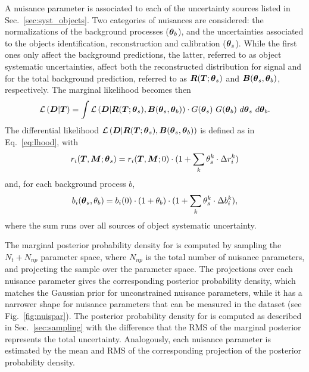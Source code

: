 A nuisance parameter is associated to each of the uncertainty sources
listed in Sec.~\ref{sec:syst_objects}. Two categories of nuisances
are considered: the normalizations of the background processes
($\boldsymbol{\theta}{}_b$), and the uncertainties associated to the objects
identification, reconstruction and calibration ($\boldsymbol{\theta}{}_s$).
While the first ones only affect the background predictions, the
latter, referred to as object systematic uncertainties, affect both the
reconstructed distribution for \ttbar{} signal and for
the total background prediction, referred to as
$\boldsymbol{R}{}(\boldsymbol{T}{};\boldsymbol{\theta}{}_s)$ and
$\boldsymbol{B}{}(\boldsymbol{\theta}{}_s,\boldsymbol{\theta}{}_b)$, respectively.
The marginal likelihood becomes then
\begin{equation}
\label{eq:marginalLhood}
  \mathcal{L}\left(\boldsymbol{D}{}|\boldsymbol{T}{}\right)=
  \int
  \mathcal{L}\left(\boldsymbol{D}{}|\boldsymbol{R}{}(\boldsymbol{T}{};\boldsymbol{\theta}{}_s),\boldsymbol{B}{}(\boldsymbol{\theta}{}_s,\boldsymbol{\theta}{}_b)\right) 
  \cdot{} G(\boldsymbol{\theta}{}_s) ~G(\boldsymbol{\theta}{}_b)
  ~d\boldsymbol{\theta}{}_s ~d\boldsymbol{\theta}{}_b.
\end{equation}
The differential likelihood
$\mathcal{L}\left(\boldsymbol{D}{}|\boldsymbol{R}{}(\boldsymbol{T}{};\boldsymbol{\theta}{}_s),\boldsymbol{B}{}(\boldsymbol{\theta}{}_s,\boldsymbol{\theta}{}_b)\right)$
is defined as in Eq.~\ref{eq:lhood}, with 
\begin{equation}
r_i(\boldsymbol{T}{},\boldsymbol{M}{};\boldsymbol{\theta}{}_s) =
r_i(\boldsymbol{T}{},\boldsymbol{M}{};0) \cdot ( 1 + \sum_k
\theta_s^k\cdot\Delta r_i^k )
\end{equation}
and, for each background process $b$,
\begin{equation}
b_i(\boldsymbol{\theta}{}_s,\theta_b) =
b_i(0) \cdot ( 1 + \theta_b) \cdot
(1 + \sum_k \theta_s^k\cdot\Delta b_i^k ),
\end{equation}
where the sum runs over all sources of object systematic uncertainty.

The marginal posterior probability density for \Truth{} is computed by
sampling the $N_t+N_{np}$ parameter space, where $N_{np}$ is the
total number of nuisance parameters, and projecting the sample over
the \Truth{} parameter space. The projections over each nuisance
parameter gives the corresponding posterior probability density,
which matches the Gaussian prior for unconstrained nuisance
parameters, while it has a narrower shape for nuisance parameters
that can be measured in the dataset (see Fig.~\ref{fig:nuispar}).
The posterior probability density for \ac{} is computed as described in
Sec.~\ref{sec:sampling} with the difference that the RMS of the
marginal posterior represents the total uncertainty. Analogously, each
nuisance parameter is estimated by the mean and RMS of the
corresponding projection of the posterior probability density.

